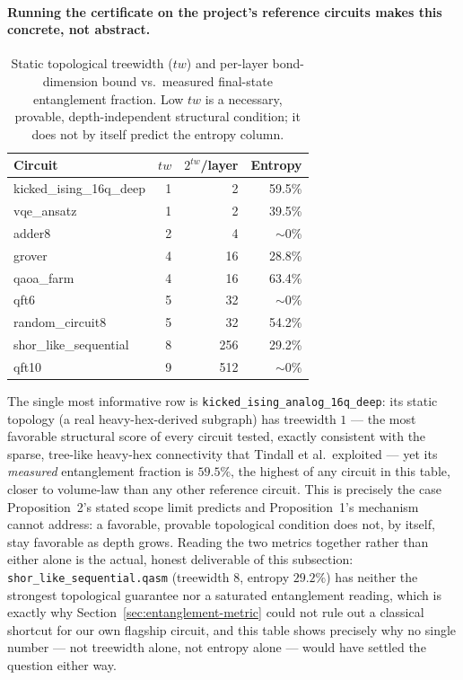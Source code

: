 \documentclass[9pt,twocolumn]{extarticle}
\begin{document}
\paragraph{Running the certificate on the project's reference circuits makes this concrete, not abstract.}
\begin{table}[h]
\centering\footnotesize
\begin{tabular}{lrrr}
\toprule
Circuit & $tw$ & $2^{tw}$/layer & Entropy \\
\midrule
kicked\_ising\_16q\_deep & 1 & 2 & 59.5\% \\
vqe\_ansatz & 1 & 2 & 39.5\% \\
adder8 & 2 & 4 & $\sim$0\% \\
grover & 4 & 16 & 28.8\% \\
qaoa\_farm & 4 & 16 & 63.4\% \\
qft6 & 5 & 32 & $\sim$0\% \\
random\_circuit8 & 5 & 32 & 54.2\% \\
shor\_like\_sequential & 8 & 256 & 29.2\% \\
qft10 & 9 & 512 & $\sim$0\% \\
\bottomrule
\end{tabular}
\caption{Static topological treewidth ($tw$) and per-layer bond-dimension
bound vs.\ measured final-state entanglement fraction. Low $tw$ is a
necessary, provable, depth-independent structural condition; it does not
by itself predict the entropy column.}
\label{tab:treewidth-vs-entropy}
\end{table}
The single most informative row is \texttt{kicked\_ising\_analog\_16q\_deep}:
its static topology (a real heavy-hex-derived subgraph) has treewidth $1$
--- the most favorable structural score of every circuit tested, exactly
consistent with the sparse, tree-like heavy-hex connectivity that Tindall
et al.\ exploited --- yet its \emph{measured} entanglement fraction is
$59.5\%$, the highest of any circuit in this table, closer to volume-law
than any other reference circuit. This is precisely the case
Proposition~2's stated scope limit predicts and Proposition~1's mechanism
cannot address: a favorable, provable topological condition does not, by
itself, stay favorable as depth grows. Reading the two metrics together
rather than either alone is the actual, honest deliverable of this
subsection: \texttt{shor\_like\_sequential.qasm} (treewidth $8$, entropy
$29.2\%$) has neither the strongest topological guarantee nor a
saturated entanglement reading, which is exactly why
Section~\ref{sec:entanglement-metric} could not rule out a classical
shortcut for our own flagship circuit, and this table shows precisely why
no single number --- not treewidth alone, not entropy alone --- would have
settled the question either way.
\end{document}
